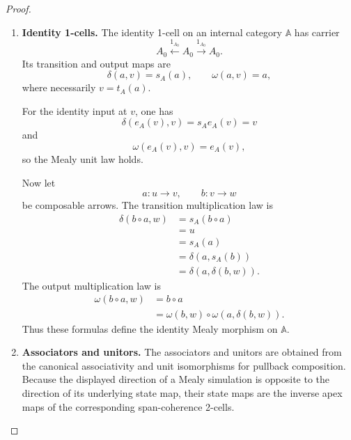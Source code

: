 \begin{proof}
\begin{enumerate}
        Horizontal composition of 2-cells is the construction of
        Proposition~\ref{prop:mealy-simulations-horizontal-composition}.
        Proposition~\ref{prop:mealy-horizontal-composition-functorial} proves
        that this operation preserves identity simulations and vertical
        composites. Thus pipeline composition defines a functor on each pair
        of hom-categories.

        \item \textbf{Identity 1-cells.}
        The identity 1-cell on an internal category \(\mathbb A\) has carrier
        \[
            A_0
            \xleftarrow{1_{A_0}}
            A_0
            \xrightarrow{1_{A_0}}
            A_0.
        \]
        Its transition and output maps are
        \[
            \delta(a,v)=s_A(a),
            \qquad
            \omega(a,v)=a,
        \]
        where necessarily \(v=t_A(a)\).

        For the identity input at \(v\), one has
        \[
            \delta(e_A(v),v)
            =
            s_Ae_A(v)
            =
            v
        \]
        and
        \[
            \omega(e_A(v),v)
            =
            e_A(v),
        \]
        so the Mealy unit law holds.

        Now let
        \[
            a:u\to v,
            \qquad
            b:v\to w
        \]
        be composable arrows. The transition multiplication law is
        \[
        \begin{aligned}
            \delta(b\circ a,w)
            &=
            s_A(b\circ a)
            \\
            &=
            u
            \\
            &=
            s_A(a)
            \\
            &=
            \delta(a,s_A(b))
            \\
            &=
            \delta(a,\delta(b,w)).
        \end{aligned}
        \]
        The output multiplication law is
        \[
        \begin{aligned}
            \omega(b\circ a,w)
            &=
            b\circ a
            \\
            &=
            \omega(b,w)\circ
            \omega(a,\delta(b,w)).
        \end{aligned}
        \]
        Thus these formulas define the identity Mealy morphism on
        \(\mathbb A\).

        \item \textbf{Associators and unitors.}
        The associators and unitors are obtained from the canonical
        associativity and unit isomorphisms for pullback composition.
        Because the displayed direction of a Mealy simulation is opposite to
        the direction of its underlying state map, their state maps are the
        inverse apex maps of the corresponding span-coherence 2-cells.


\end{enumerate}
\end{proof}
